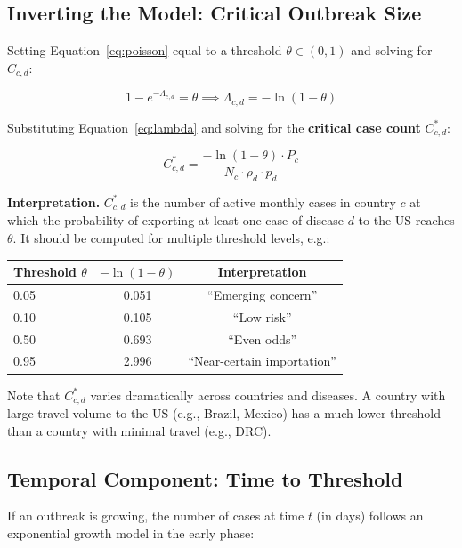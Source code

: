 \documentclass[12pt]{article}
\begin{document}
\subsection{Inverting the Model: Critical Outbreak Size}

Setting Equation~\ref{eq:poisson} equal to a threshold
$\theta \in (0,1)$ and solving for $C_{c,d}$:

\begin{equation}
  1 - e^{-\Lambda_{c,d}} = \theta
  \implies
  \Lambda_{c,d} = -\ln(1 - \theta)
\end{equation}

Substituting Equation~\ref{eq:lambda} and solving for the
\textbf{critical case count} $C_{c,d}^*$:

\begin{equation}
  \boxed{
    C_{c,d}^* =
    \frac{-\ln(1 - \theta) \cdot P_c}{N_c \cdot \rho_d \cdot p_d}
  }
  \label{eq:critical}
\end{equation}

\textbf{Interpretation.} $C_{c,d}^*$ is the number of active
monthly cases in country $c$ at which the probability of exporting
at least one case of disease $d$ to the US reaches $\theta$.
It should be computed for multiple threshold levels, e.g.:

\begin{center}
\begin{tabular}{lcc}
\toprule
\textbf{Threshold $\theta$} & \textbf{$-\ln(1-\theta)$} &
\textbf{Interpretation} \\
\midrule
0.05  & 0.051 & ``Emerging concern'' \\
0.10  & 0.105 & ``Low risk'' \\
0.50  & 0.693 & ``Even odds'' \\
0.95  & 2.996 & ``Near-certain importation'' \\
\bottomrule
\end{tabular}
\end{center}

Note that $C_{c,d}^*$ varies dramatically across countries and
diseases. A country with large travel volume to the US (e.g.,
Brazil, Mexico) has a much lower threshold than a country with
minimal travel (e.g., DRC).

\subsection{Temporal Component: Time to Threshold}

If an outbreak is growing, the number of cases at time $t$ (in days)
follows an exponential growth model in the early phase:
\end{document}
